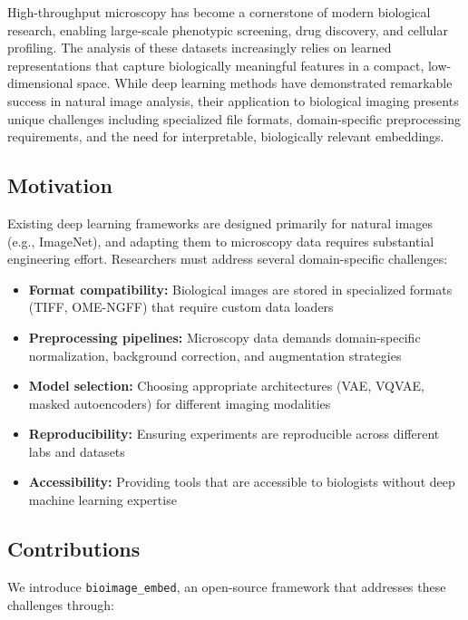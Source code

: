 High-throughput microscopy has become a cornerstone of modern biological research, enabling large-scale phenotypic screening, drug discovery, and cellular profiling. The analysis of these datasets increasingly relies on learned representations that capture biologically meaningful features in a compact, low-dimensional space. While deep learning methods have demonstrated remarkable success in natural image analysis, their application to biological imaging presents unique challenges including specialized file formats, domain-specific preprocessing requirements, and the need for interpretable, biologically relevant embeddings.

\subsection{Motivation}

Existing deep learning frameworks are designed primarily for natural images (e.g., ImageNet), and adapting them to microscopy data requires substantial engineering effort. Researchers must address several domain-specific challenges:

\begin{itemize}
    \item \textbf{Format compatibility:} Biological images are stored in specialized formats (TIFF, OME-NGFF) that require custom data loaders
    \item \textbf{Preprocessing pipelines:} Microscopy data demands domain-specific normalization, background correction, and augmentation strategies
    \item \textbf{Model selection:} Choosing appropriate architectures (VAE, VQVAE, masked autoencoders) for different imaging modalities
    \item \textbf{Reproducibility:} Ensuring experiments are reproducible across different labs and datasets
    \item \textbf{Accessibility:} Providing tools that are accessible to biologists without deep machine learning expertise
\end{itemize}

\subsection{Contributions}

We introduce \texttt{bioimage\_embed}, an open-source framework that addresses these challenges through:

